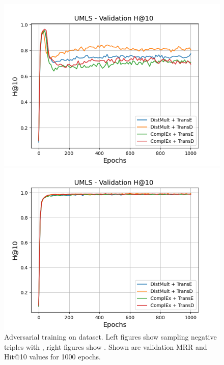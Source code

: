 \begin{figure}[H]
    \begin{minipage}{.5\textwidth}
      \centering
      \includegraphics[width=0.9\linewidth]{figures/results/gan_train/not_pretrained/uncertainty/max/entropy/umls/1k_epochs/uncertainty_umls_hit10.png}
    \end{minipage}%
    \begin{minipage}{.5\textwidth}
      \centering
      \includegraphics[width=0.9\linewidth]{figures/results/gan_train/not_pretrained/uncertainty/max_distribution/entropy/umls/1k_epochs/uncertainty_umls_hit10.png}
    \end{minipage}%
    \caption{Adversarial training on \umls dataset. 
    Left figures show sampling negative triples with \usmax, right figures show \ussoftmax.
    Shown are validation MRR and Hit@10 values for 1000 epochs.}
    \label{fig:advtrain_umls_usmax_ussoftmax}
\end{figure}

